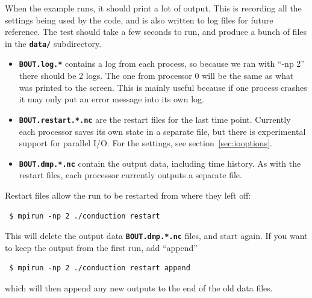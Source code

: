 \documentclass[12pt]{article}
\newcommand{\file}[1]{\texttt{\bf #1}}
\begin{document}
When the example runs, it should print a lot of output. This is recording all the settings being used by the
code, and is also written to log files for future reference. The test should take a few seconds to run, and
produce a bunch of files in the \file{data/} subdirectory.
\begin{itemize}
\item \file{BOUT.log.*} contains a log from each process, so because we ran with ``-np 2'' there should be 2 logs. 
  The one from processor $0$ will be the same as what was printed to the screen. This is mainly useful because
  if one process crashes it may only put an error message into its own log.
\item \file{BOUT.restart.*.nc} are the restart files for the last time point. 
  Currently each processor saves its own state in a separate file, but there is experimental
  support for parallel I/O. For the settings, see section~\ref{sec:iooptions}.
\item \file{BOUT.dmp.*.nc} contain the output data, including time history. As with the restart
  files, each processor currently outputs a separate file.
\end{itemize}

Restart files allow the run to be restarted from where they left off:
\begin{verbatim}
 $ mpirun -np 2 ./conduction restart
\end{verbatim}
This will delete the output data \file{BOUT.dmp.*.nc} files, and start again. If you want to keep the output
from the first run, add ``append'' 
\begin{verbatim}
 $ mpirun -np 2 ./conduction restart append
\end{verbatim}
which will then append any new outputs to the end of the old data files.
\end{document}
